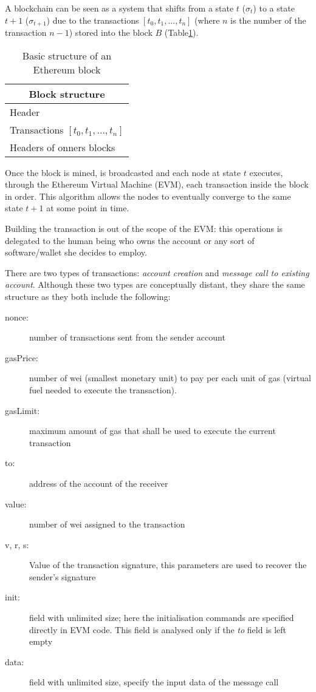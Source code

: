 A blockchain can be seen as a system that shifts from a state $t$ ($\sigma_t$) to a state $t+1$ ($\sigma_{t+1}$) due to the transactions $[t_0,t_1,...,t_n]$ (where $n$ is the number of the transaction $n-1$) stored into the block $B$ (Table\ref{table:2}).


\begin{table}[h!]
\centering
\caption{Basic structure of an Ethereum block}
\begin{tabular}{ |p{3cm}|  }
\hline
\multicolumn{1}{|c|}{Block structure} \\
\hline
\hline
Header \\
\hline
Transactions $[t_0,t_1,...,t_n]$ \\
\hline
Headers of onners blocks\\
\hline
\end{tabular}
\label{table:2}
\end{table}

Once the block is mined, is broadcasted and each node at state $t$  executes, through the Ethereum Virtual Machine (EVM), each transaction inside the block in order.
This algorithm allows the nodes to eventually converge to the same state $t+1$ at some point in time.

Building the transaction is out of the scope of the EVM: this operations is delegated to the human being who owns the account or any sort of software/wallet she decides to employ.

There are two types of transactions: \textit{account creation} and \textit{message call to existing account}. Although these two types are conceptually distant, they share the same structure as they both include the following:

\begin{description}
  \item[nonce:] number of transactions sent from the sender account
  \item[gasPrice:] number of wei (smallest monetary unit) to pay per each unit of gas (virtual fuel needed to execute the transaction).
  \item[gasLimit:] maximum amount of gas that shall be used to execute the current transaction
  \item[to:] address of the account of the receiver
  \item[value:] number of wei assigned to the transaction
  \item[v, r, s:] Value of the transaction signature, this parameters are used to recover the sender's signature \cite{gura2004comparing}
  \item[init:] field with unlimited size; here the initialisation commands are specified directly in EVM code. This field is analysed only if the \textit{to} field is left empty
  \item[data:] field with unlimited size, specify the input data of the message call
\end{description}

